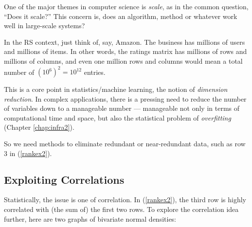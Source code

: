 One of the major themes in computer science is \textit{scale}, as in the
common question, ``Does it scale?''  This concern is, does an algorithm,
method or whatever work well in large-scale systems?

In the RS context, just think of, say, Amazon.  The business has
millions of users and millions of items.  In other words, the ratings
matrix has millions of rows and millions of columns, and even one
million rows and columns would mean a total number of $(10^6)^2 =
10^{12}$ entries.

This is a core point in statistics/machine learning, the notion of
\textit{dimension reduction}.  In complex applications, there is a
pressing need to reduce the number of variables down to a 
manageable number --- manageable not only in terms of computational time
and space, but also the statistical problem of \textit{overfitting}
(Chapter \ref{chap:infra2}).

So we need methods to eliminate redundant or near-redundant data, such
as row 3 in (\ref{rankex2}).

\subsection{Exploiting Correlations}

Statistically, the issue is one of correlation.  In (\ref{rankex2}), the
third row is highly correlated with (the sum of) the first two rows.  To
explore the correlation idea further, here are two graphs of bivariate
normal densities:

